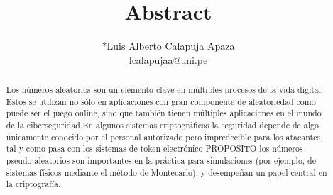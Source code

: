 \documentclass[10pt,a4paper]{article}
\author{{*}Luis Alberto Calapuja Apaza \\lcalapujaa$@$uni.pe}
\title{Abstract}
\begin{document}
\maketitle
\begin{abstract}
Los números aleatorios son un elemento clave en múltiples procesos de la vida digital. Estos se utilizan no sólo en aplicaciones con gran componente de aleatoriedad como puede ser el juego online, sino que también tienen múltiples aplicaciones en el mundo de la ciberseguridad.En algunos sistemas criptográficos la seguridad depende de algo únicamente conocido por el personal autorizado pero impredecible para los atacantes, tal y como pasa con los sistemas de token electrónico
PROPOSITO los números pseudo-aleatorios son importantes en la práctica para simulaciones (por ejemplo, de sistemas físicos mediante el método de Montecarlo), y desempeñan un papel central en la criptografía. 
\end{abstract}
\end{document}
